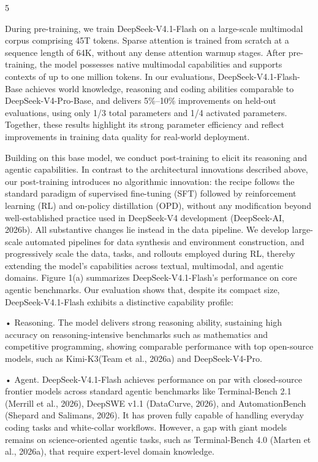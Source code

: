 \documentclass[
  10
]{article}
\begin{document}
5

During pre-training, we train DeepSeek-V4.1-Flash on a large-scale
multimodal corpus comprising 45T tokens. Sparse attention is trained
from scratch at a sequence length of 64K, without any dense attention
warmup stages. After pre-training, the model possesses native multimodal
capabilities and supports contexts of up to one million tokens. In our
evaluations, DeepSeek-V4.1-Flash-Base achieves world knowledge,
reasoning and coding abilities comparable to DeepSeek-V4-Pro-Base, and
delivers 5\%--10\% improvements on held-out evaluations, using only 1/3
total parameters and 1/4 activated parameters. Together, these results
highlight its strong parameter efficiency and reflect improvements in
training data quality for real-world deployment.

Building on this base model, we conduct post-training to elicit its
reasoning and agentic capabilities. In contrast to the architectural
innovations described above, our post-training introduces no algorithmic
innovation: the recipe follows the standard paradigm of supervised
fine-tuning (SFT) followed by reinforcement learning (RL) and on-policy
distillation (OPD), without any modification beyond well-established
practice used in DeepSeek-V4 development (DeepSeek-AI, 2026b). All
substantive changes lie instead in the data pipeline. We develop
large-scale automated pipelines for data synthesis and environment
construction, and progressively scale the data, tasks, and rollouts
employed during RL, thereby extending the model's capabilities across
textual, multimodal, and agentic domains. Figure 1(a) summarizes
DeepSeek-V4.1-Flash's performance on core agentic benchmarks. Our
evaluation shows that, despite its compact size, DeepSeek-V4.1-Flash
exhibits a distinctive capability profile:

• Reasoning. The model delivers strong reasoning ability, sustaining
high accuracy on reasoning-intensive benchmarks such as mathematics and
competitive programming, showing comparable performance with top
open-source models, such as Kimi-K3(Team et al., 2026a) and
DeepSeek-V4-Pro.

• Agent. DeepSeek-V4.1-Flash achieves performance on par with
closed-source frontier models across standard agentic benchmarks like
Terminal-Bench 2.1 (Merrill et al., 2026), DeepSWE v1.1 (DataCurve,
2026), and AutomationBench (Shepard and Salimans, 2026). It has proven
fully capable of handling everyday coding tasks and white-collar
workflows. However, a gap with giant models remains on science-oriented
agentic tasks, such as Terminal-Bench 4.0 (Marten et al., 2026a), that
require expert-level domain knowledge.
\end{document}
